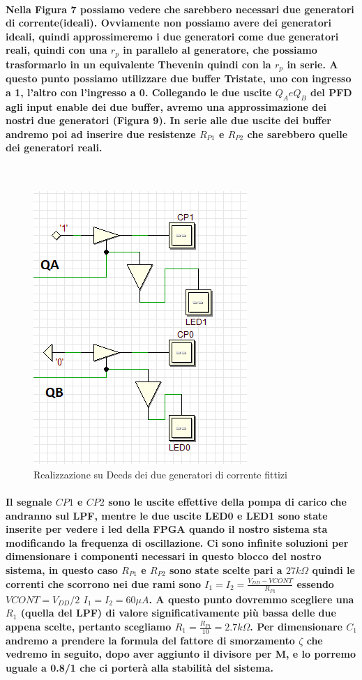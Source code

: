 \documentclass[a4paper]{article}
\begin{document}
\paragraph{Nella Figura 7 possiamo vedere che sarebbero necessari due generatori di corrente(ideali).
Ovviamente non possiamo avere dei generatori ideali, quindi approssimeremo i due generatori come due generatori reali, quindi con una $r_p$ in parallelo al generatore, che possiamo trasformarlo in un equivalente Thevenin quindi con la $r_p$ in serie.
A questo punto possiamo utilizzare due buffer Tristate, uno con ingresso a 1, l'altro con l'ingresso a 0. Collegando le due uscite $Q_A e Q_B$ del PFD agli input enable dei due buffer, avremo una approssimazione dei nostri due generatori (Figura 9). In serie alle due uscite dei buffer andremo poi ad inserire due resistenze $R_{P1}$ e  $R_{P2}$ che sarebbero quelle dei generatori reali.}
~\begin{figure}[H]%
\includegraphics[scale=0.8]{CPDeeds.png} 
\centering
\caption{Realizzazione su Deeds dei due generatori di corrente fittizi}
\label{fig:foo}
\end{figure}
\paragraph{Il segnale $CP1$ e $CP2$ sono le uscite effettive della pompa di carico che andranno sul LPF, mentre le due uscite LED0 e LED1 sono state inserite per vedere i led della FPGA quando il nostro sistema sta modificando la frequenza di oscillazione. Ci sono infinite soluzioni per dimensionare i componenti necessari in questo blocco del nostro sistema, in questo caso $R_{P1}$ e  $R_{P2}$ sono state scelte pari a $27k\Omega$ quindi le correnti che scorrono nei due rami sono $I_1=I_2=\frac{V_{DD}-V{CONT}}{R_{P1}}$ essendo $V{CONT}=V_{DD}/2$ $I_1=I_2=60\mu A$. A questo punto dovremmo scegliere una $R_1$ (quella del LPF) di valore significativamente più bassa delle due appena scelte, pertanto scegliamo $R_1=\frac{R_{P1}}{10}=2.7k\Omega$.
Per dimensionare $C_1$ andremo a prendere la formula del fattore di smorzamento $\zeta$ che vedremo in seguito, dopo aver aggiunto il divisore per M, e lo porremo uguale a 0.8/1 che ci porterà alla stabilità del sistema. }
\end{document}
